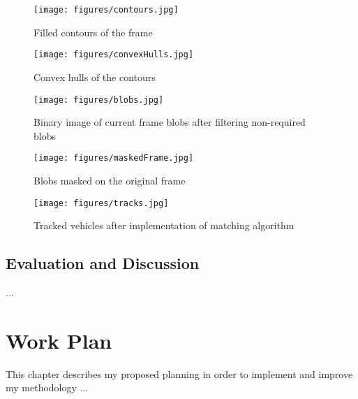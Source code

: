 \documentclass[a4paper]{aitthesis}
\begin{document}
\begin{figure}[H]
\begin{center}
\texttt{[image: figures/contours.jpg]} 
\caption{Filled contours of the frame}
\end{center}
\end{figure}



\begin{figure}[H]
\begin{center}
\texttt{[image: figures/convexHulls.jpg]}
\caption{Convex hulls of the contours}
\end{center}
\end{figure}

\begin{figure}[H]
\begin{center}
\texttt{[image: figures/blobs.jpg]}
\caption{Binary image of current frame blobs after filtering non-required blobs}
\end{center}
\end{figure}


\begin{figure}[H]
\begin{center}
\texttt{[image: figures/maskedFrame.jpg]} 
\caption{Blobs masked on the original frame}
\label{figure:cap1}
\end{center}
\end{figure}




\begin{figure}[H]
\begin{center}
\texttt{[image: figures/tracks.jpg]}
\caption{Tracked vehicles after implementation of matching algorithm}
\label{fig:cap1}
\end{center}
\end{figure}

\section{Evaluation and Discussion}
...

\FloatBarrier

%
\chapter{Work Plan} \label{planning}
This chapter describes my proposed planning in order to implement and improve 
my methodology ...
\end{document}
